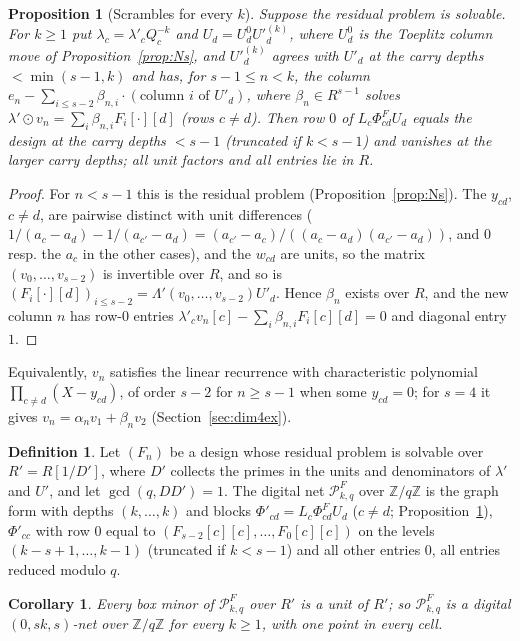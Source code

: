 \documentclass[11pt]{amsart}
\newtheorem{proposition}[theorem]{Proposition}
\newtheorem{corollary}[theorem]{Corollary}
\theoremstyle{definition}
\newtheorem{definition}[theorem]{Definition}
\theoremstyle{plain}
\newcommand{\Z}{\mathbb{Z}}
\begin{document}
\begin{proposition}[Scrambles for every $k$]\label{prop:Gs}
Suppose the residual problem is solvable. For $k\ge1$ put $\lambda_c=\lambda'_cQ_c^{-k}$ and $U_d=U^0_dU'^{(k)}_d$, where $U^0_d$ is the Toeplitz column move of Proposition~\ref{prop:Ns}, and $U'^{(k)}_d$ agrees with $U'_d$ at the carry depths $<\min(s-1,k)$ and has, for $s-1\le n<k$, the column $e_n-\sum_{i\le s-2}\beta_{n,i}\cdot(\text{column }i\text{ of }U'_d)$, where $\beta_n\in R^{s-1}$ solves $\lambda'\odot v_n=\sum_i\beta_{n,i}F_i[\cdot][d]$ (rows $c\ne d$). Then row $0$ of $L_c\Phi^F_{cd}U_d$ equals the design at the carry depths $<s-1$ (truncated if $k<s-1$) and vanishes at the larger carry depths; all unit factors and all entries lie in $R$.
\end{proposition}

\begin{proof}
For $n<s-1$ this is the residual problem (Proposition~\ref{prop:Ns}). The $y_{cd}$, $c\ne d$, are pairwise distinct with unit differences ($1/(a_c-a_d)-1/(a_{c'}-a_d)=(a_{c'}-a_c)/((a_c-a_d)(a_{c'}-a_d))$, and $0$ resp. the $a_c$ in the other cases), and the $w_{cd}$ are units, so the matrix $(v_0,\dots,v_{s-2})$ is invertible over $R$, and so is $(F_i[\cdot][d])_{i\le s-2}=\Lambda'(v_0,\dots,v_{s-2})U'_d$. Hence $\beta_n$ exists over $R$, and the new column $n$ has row-$0$ entries $\lambda'_cv_n[c]-\sum_i\beta_{n,i}F_i[c][d]=0$ and diagonal entry $1$.
\end{proof}

Equivalently, $v_n$ satisfies the linear recurrence with characteristic polynomial $\prod_{c\ne d}(X-y_{cd})$, of order $s-2$ for $n\ge s-1$ when some $y_{cd}=0$; for $s=4$ it gives $v_n=\alpha_nv_1+\beta_nv_2$ (Section~\ref{sec:dim4ex}).

\begin{definition}\label{def:Ns}
Let $(F_n)$ be a design whose residual problem is solvable over $R'=R[1/D']$, where $D'$ collects the primes in the units and denominators of $\lambda'$ and $U'$, and let $\gcd(q,DD')=1$. The digital net $\mathcal P^F_{k,q}$ over $\Z/q\Z$ is the graph form with depths $(k,\dots,k)$ and blocks $\Phi'_{cd}=L_c\Phi^F_{cd}U_d$ ($c\ne d$; Proposition~\ref{prop:Gs}), $\Phi'_{cc}$ with row $0$ equal to $(F_{s-2}[c][c],\dots,F_0[c][c])$ on the levels $(k-s+1,\dots,k-1)$ (truncated if $k<s-1$) and all other entries $0$, all entries reduced modulo $q$.
\end{definition}

\begin{corollary}\label{cor:tsk}
Every box minor of $\mathcal P^F_{k,q}$ over $R'$ is a unit of $R'$; so $\mathcal P^F_{k,q}$ is a digital $(0,sk,s)$-net over $\Z/q\Z$ for every $k\ge1$, with one point in every cell.
\end{corollary}
\end{document}
